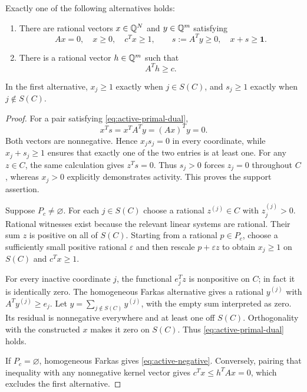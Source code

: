 \begin{lemma}\label{lem:active-pair}
Exactly one of the following alternatives holds:
\begin{enumerate}
\item There are rational vectors $x\in\mathbb Q^N$ and $y\in\mathbb Q^m$ satisfying
\begin{equation}\label{eq:active-primal-dual}
 Ax=0,\quad x\ge0,\quad c^Tx\ge1,\qquad
 s:=A^Ty\ge0,\quad x+s\ge\mathbf1.
\end{equation}
\item There is a rational vector $h\in\mathbb Q^m$ such that
\begin{equation}\label{eq:active-negative}
 A^Th\ge c.
\end{equation}
\end{enumerate}
In the first alternative, $x_j\ge1$ exactly when $j\in S(C)$, and
$s_j\ge1$ exactly when $j\notin S(C)$.
\end{lemma}

\begin{proof}
For a pair satisfying \eqref{eq:active-primal-dual},
\[
 x^Ts=x^TA^Ty=(Ax)^Ty=0.
\]
Both vectors are nonnegative.  Hence $x_js_j=0$ in every coordinate, while
$x_j+s_j\ge1$ ensures that exactly one of the two entries is at least one.
For any $z\in C$, the same calculation gives $z^Ts=0$.  Thus $s_j>0$
forces $z_j=0$ throughout $C$, whereas $x_j>0$ explicitly demonstrates
activity.  This proves the support assertion.

Suppose $P_c\ne\varnothing$.  For each $j\in S(C)$ choose a rational
$z^{(j)}\in C$ with $z^{(j)}_j>0$.  Rational witnesses exist because the
relevant linear systems are rational.  Their sum $z$ is positive on all of
$S(C)$.  Starting from a rational $p\in P_c$, choose a sufficiently small
positive rational $\varepsilon$ and then rescale $p+\varepsilon z$ to obtain
$x_j\ge1$ on $S(C)$ and $c^Tx\ge1$.

For every inactive coordinate $j$, the functional $e_j^Tz$ is nonpositive
on $C$; in fact it is identically zero.  The homogeneous Farkas alternative
gives a rational $y^{(j)}$ with $A^Ty^{(j)}\ge e_j$.  Let
$y=\sum_{j\notin S(C)}y^{(j)}$, with the empty sum interpreted as zero.
Its residual is nonnegative everywhere and at least one off $S(C)$.
Orthogonality with the constructed $x$ makes it zero on $S(C)$.  Thus
\eqref{eq:active-primal-dual} holds.

If $P_c=\varnothing$, homogeneous Farkas gives
\eqref{eq:active-negative}.  Conversely, pairing that inequality with any
nonnegative kernel vector gives $c^Tx\le h^TAx=0$, which excludes the first
alternative.
\end{proof}


